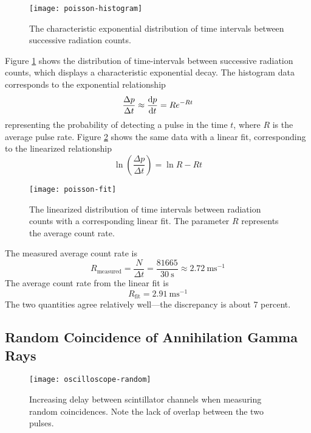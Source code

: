 \documentclass[11pt, a4paper]{article}
\begin{document}
\begin{figure}[htb!]
\centering
\texttt{[image: poisson-histogram]}
\caption{The characteristic exponential distribution of time intervals between successive radiation counts.}
\label{korzargam:fig:poisson-hist}
\end{figure}


Figure \ref{korzargam:fig:poisson-hist} shows the distribution of time-intervals between successive radiation counts, which displays a characteristic exponential decay. The histogram data corresponds to the exponential relationship
\begin{equation*}
	\frac{\Delta p}{\Delta t} \approx \dv{p}{t} = Re^{-Rt}
\end{equation*}
representing the probability of detecting a pulse in the time $ t $, where $ R $ is the average pulse rate. Figure \ref{korzargam:fig:poisson-fit} shows the same data with a linear fit, corresponding to the linearized relationship
\begin{equation*}
	\ln(\frac{\Delta p}{\Delta t}) = \ln R - Rt
\end{equation*}

\begin{figure}[htb!]
\centering
\texttt{[image: poisson-fit]}
\caption{The linearized distribution of time intervals between radiation counts with a corresponding linear fit. The parameter $ R $ represents the average count rate.}
\label{korzargam:fig:poisson-fit}
\end{figure}

The measured average count rate is
\begin{equation*}
	R_{\text{measured}} = \frac{N}{\Delta t} = \frac{81665}{\SI{30}{\second}} \approx \SI{2.72}{\milli \second^{-1}}
\end{equation*}
The average count rate from the linear fit is
\begin{equation*}
	R_{\text{fit}} = \SI{2.91}{\milli \second^{-1}}
\end{equation*}
The two quantities agree relatively well---the discrepancy is about 7 percent. 


\subsection{Random Coincidence of Annihilation Gamma Rays}

\begin{figure}
\centering
\texttt{[image: oscilloscope-random]}
\caption{Increasing delay between scintillator channels when measuring random coincidences. Note the lack of overlap between the two pulses.}
\label{korzargam:fig:oscilloscope}
\end{figure}
\end{document}
